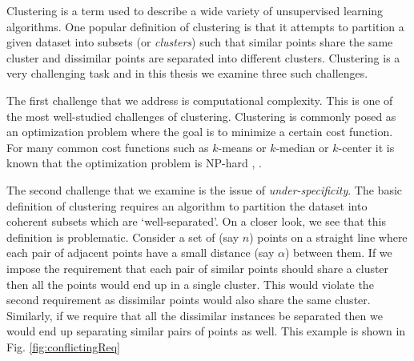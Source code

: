 \documentclass[12pt]{article}
\begin{document}
\fi

Clustering is a term used to describe a wide variety of unsupervised learning algorithms. One popular definition of clustering is that it attempts to partition a given dataset into subsets (or {\em clusters}) such that similar points share the same cluster and dissimilar points are separated into different clusters. Clustering is a very challenging task and in this thesis we examine three such challenges.

The first challenge that we address is computational complexity. This is one of the most well-studied challenges of clustering. Clustering is commonly posed as an optimization problem where the goal is to minimize a certain cost function. For many common cost functions such as $k$-means or $k$-median or $k$-center it is known that the optimization problem is NP-hard \cite{dasgupta2008hardness}, \cite{megiddo1984complexity}.

The second challenge that we examine is the issue of {\em under-specificity}. The basic definition of clustering requires an algorithm to partition the dataset into coherent subsets which are `well-separated'. On a closer look, we see that this definition is problematic. Consider a set of (say $n$) points on a straight line where each pair of adjacent points have a small distance (say $\alpha$) between them. If we impose the requirement that each pair of similar points should share a cluster then all the points would end up in a single cluster. This would violate the second requirement as dissimilar points would also share the same cluster. Similarly, if we require that all the dissimilar instances be separated then we would end up separating similar pairs of points as well. This example is shown in Fig. \ref{fig:conflictingReq}
\end{document}
